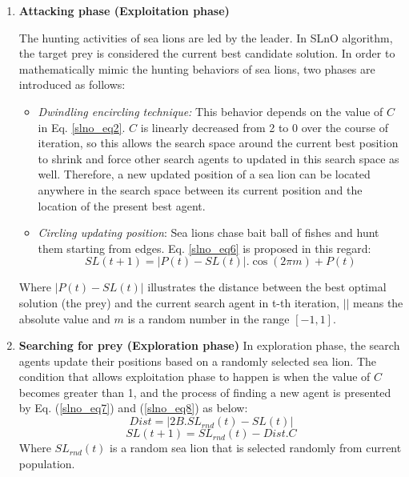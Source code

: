 \documentclass[a4paper,13pt,2p]{report}
\begin{document}
\begin{enumerate}
\item \textbf{Attacking phase (Exploitation phase)}
 
 The hunting activities of sea lions are led by the leader. In SLnO algorithm, the target prey is considered the current best candidate solution. In order to mathematically mimic the hunting behaviors of sea lions, two phases are introduced as follows:
 	
\begin{itemize}
\item \textit{Dwindling encircling technique:}
	This behavior depends on the value of $C$ in Eq. \ref{slno_eq2}. $C$ is linearly decreased from 2 to 0 over the course of iteration, so this allows the search space around the current best position to shrink and force other search agents to updated in this search space as well. Therefore, a new updated position of a sea lion can be located anywhere in the search space between its current position and the location of the present best agent.

\item \textit{Circling updating position}: Sea lions chase bait ball of fishes and hunt them starting from edges. Eq. \ref{slno_eq6} is proposed in this regard:
\begin{equation} \label{slno_eq6}
SL(t+1) = |P(t) - SL(t)|.\cos(2 \pi m) + P(t)
\end{equation}	
\end{itemize}
	Where $|P(t) - SL(t)|$ illustrates the distance between the best optimal solution (the prey) and the current search agent in t-th iteration, $||$ means the absolute value and $m$ is a random number in the range $[-1, 1]$.
	
\item \textbf{Searching for prey (Exploration phase)}
	In exploration phase, the search agents update their positions based on a randomly selected sea lion. The condition that allows exploitation phase to happen is when the value of $C$ becomes greater than 1, and the process of finding a new agent is presented by Eq. (\ref{slno_eq7}) and (\ref{slno_eq8}) as below:
\begin{equation}\label{slno_eq7}
Dist = |2B.SL_{rnd}(t) - SL(t)|
\end{equation}
\begin{equation}\label{slno_eq8}
SL(t+1) = SL_{rnd}(t) - Dist.C 
\end{equation}  
Where $SL_{rnd}(t)$ is a random sea lion that is selected randomly from current population.

\end{enumerate}	
\end{document}
